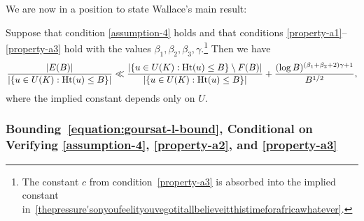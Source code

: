 We are now in a position to state Wallace's main result:
\begin{theorem} \label{theorem:wallace-hit}
	Suppose that condition \ref{assumption-4} holds and that conditions \ref{property-a1}--\ref{property-a3} hold with the values $\beta_1, \beta_2, \beta_3, \gamma$.\footnote{The constant $c$ from condition~\ref{property-a3} is absorbed into the implied constant in~\eqref{thepressure'sonyoufeelityouvegotitallbelieveitthistimeforafricawhatever}.} Then
we have 	\begin{equation}\label{thepressure'sonyoufeelityouvegotitallbelieveitthistimeforafricawhatever}
			\frac{|E(B)|}{|\{u \in U(K) : \operatorname{Ht}(u) \le B\}|} \ll \frac{|\{u \in U(K) : \operatorname{Ht}(u) \le B\} \setminus F(B)|}{|\{u \in U(K) : \operatorname{Ht}(u) \le B\}|} + \frac{(\log B)^{(\beta_1 + \beta_2 + 2)\gamma +1}}{B^{1/2}},
		\end{equation}
        where the implied constant depends only on $U$.
	\end{theorem}
	
	\subsubsection{Bounding~\ref{equation:goursat-l-bound}, Conditional on Verifying \ref{assumption-4}, \ref{property-a2}, and \ref{property-a3}}

